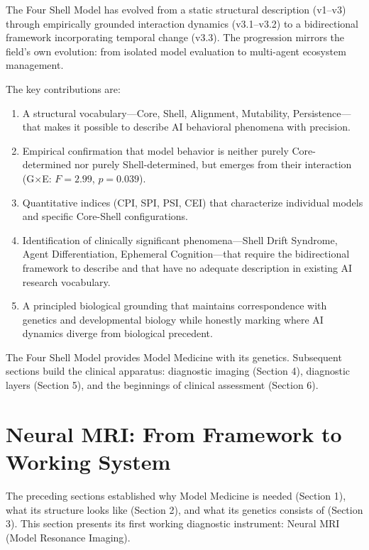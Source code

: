 \documentclass[11pt]{article}
\begin{document}
The Four Shell Model has evolved from a static structural description (v1--v3) through empirically grounded interaction dynamics (v3.1--v3.2) to a bidirectional framework incorporating temporal change (v3.3). The progression mirrors the field's own evolution: from isolated model evaluation to multi-agent ecosystem management.

The key contributions are:

\begin{enumerate}
\item A structural vocabulary---Core, Shell, Alignment, Mutability, Persistence---that makes it possible to describe AI behavioral phenomena with precision.

\item Empirical confirmation that model behavior is neither purely Core-determined nor purely Shell-determined, but emerges from their interaction (G$\times$E: $F=2.99$, $p=0.039$).

\item Quantitative indices (CPI, SPI, PSI, CEI) that characterize individual models and specific Core-Shell configurations.

\item Identification of clinically significant phenomena---Shell Drift Syndrome, Agent Differentiation, Ephemeral Cognition---that require the bidirectional framework to describe and that have no adequate description in existing AI research vocabulary.

\item A principled biological grounding that maintains correspondence with genetics and developmental biology while honestly marking where AI dynamics diverge from biological precedent.
\end{enumerate}

The Four Shell Model provides Model Medicine with its genetics. Subsequent sections build the clinical apparatus: diagnostic imaging (Section 4), diagnostic layers (Section 5), and the beginnings of clinical assessment (Section 6).

\section{Neural MRI: From Framework to Working System}

The preceding sections established why Model Medicine is needed (Section 1), what its structure looks like (Section 2), and what its genetics consists of (Section 3). This section presents its first working diagnostic instrument: Neural MRI (Model Resonance Imaging).
\end{document}
